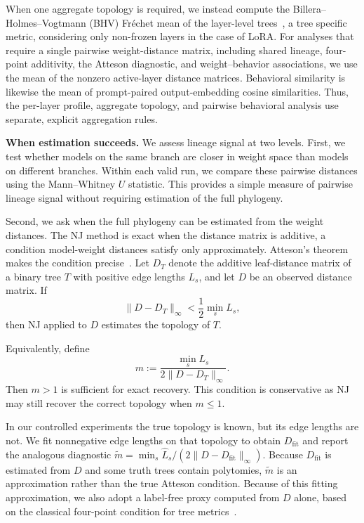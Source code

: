 \documentclass{article}
\theoremstyle{definition}
\theoremstyle{plain}
\begin{document}
When one aggregate topology is required, we instead compute the Billera--Holmes--Vogtmann (BHV)
Fr\'echet mean of the layer-level trees~\citep{billera2001geometry, willis2019confidence}, a tree specific metric, considering only non-frozen layers in the case of LoRA.   For analyses that require a single pairwise
weight-distance matrix, including shared lineage, four-point additivity, the Atteson diagnostic,
and weight--behavior associations, we use the mean of the nonzero active-layer distance
matrices. Behavioral similarity is likewise the mean of prompt-paired output-embedding
cosine similarities. Thus, the per-layer profile, aggregate topology, and pairwise behavioral
analysis use separate, explicit aggregation rules.



\textbf{When estimation succeeds.}\label{sec:framework:theory}
We assess lineage signal at two levels. First, we test whether models on the same branch are closer in weight space than models on different branches. Within each valid run, we compare these pairwise distances using the Mann--Whitney $U$ statistic. This provides a simple measure of pairwise lineage signal without requiring estimation of the full phylogeny.

Second, we ask when the full phylogeny can be estimated from the weight distances. The NJ method is exact when the distance matrix is
additive, a condition model-weight distances satisfy only approximately. Atteson's theorem makes the
condition precise~\citep{atteson1999performance}. Let $D_T$ denote the additive leaf-distance matrix of a binary tree $T$ with positive edge lengths ${L_s}$, and let $D$ be an observed distance matrix. If
$$
\lVert D-D_T\rVert_\infty < \frac{1}{2}\min_s L_s,
$$
then NJ applied to $D$ estimates the topology of $T$.

Equivalently, define
$$
m:=\frac{\min_s L_s}{2\lVert D-D_T\rVert_\infty}.
$$
Then $m>1$ is sufficient for exact recovery. This condition is conservative as NJ may still recover the correct topology when $m\leq1$.

In our controlled experiments the true topology is
known, but its edge lengths are not. We fit nonnegative edge lengths on that topology to obtain
$D_{\mathrm{fit}}$ and report the analogous diagnostic
$\widetilde m=\min_s\widehat L_s/(2\lVert D-D_{\mathrm{fit}}\rVert_\infty)$. Because
$D_{\mathrm{fit}}$ is estimated from $D$ and some truth trees contain polytomies, $\widetilde m$ is an approximation rather than the true Atteson condition.  Because of this fitting approximation, we also
adopt a label-free proxy computed from $D$ alone, based on the classical four-point condition for tree
metrics~\citep{sempleSteel2003phylogenetics}.
\end{document}
